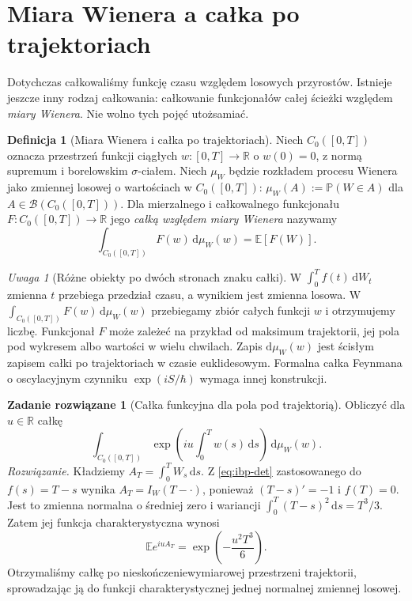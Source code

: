 \documentclass[11pt,a4paper,oneside]{report}
\numberwithin{equation}{chapter}
\theoremstyle{plain}
\theoremstyle{definition}
\newtheorem{definicja}{Definicja}[chapter]
\newtheorem{zadanie}{Zadanie rozwiązane}[chapter]
\theoremstyle{remark}
\newtheorem{uwaga}{Uwaga}[chapter]
\newcommand{\R}{\mathbb{R}}
\newcommand{\Prob}{\mathbb{P}}
\newcommand{\E}{\mathbb{E}}
\newcommand{\calB}{\mathcal{B}}
\newcommand{\dd}{\mathrm{d}}
\begin{document}
\section{Miara Wienera a całka po trajektoriach}
Dotychczas całkowaliśmy funkcję czasu względem losowych
przyrostów. Istnieje jeszcze inny rodzaj całkowania:
całkowanie funkcjonałów całej ścieżki względem \emph{miary
Wienera}. Nie wolno tych pojęć utożsamiać.

\begin{definicja}[Miara Wienera i całka po trajektoriach]
Niech $C_0([0,T])$ oznacza przestrzeń funkcji ciągłych
$w:[0,T]\to\R$ o $w(0)=0$, z normą supremum i borelowskim
$\sigma$-ciałem. Niech $\mu_W$ będzie rozkładem procesu Wienera
jako zmiennej losowej o wartościach w $C_0([0,T])$:
$\mu_W(A):=\Prob(W\in A)$ dla $A\in\calB(C_0([0,T]))$.
Dla mierzalnego i całkowalnego funkcjonału
$F:C_0([0,T])\to\R$ jego \emph{całką względem miary Wienera}
nazywamy
\[
\int_{C_0([0,T])}F(w)\,\dd\mu_W(w)=\E[F(W)].
\tag{1.7}
\]
\end{definicja}

\begin{uwaga}[Różne obiekty po dwóch stronach znaku całki]
W $\int_0^Tf(t)\,\dd W_t$ zmienna $t$ przebiega przedział
czasu, a wynikiem jest zmienna losowa. W
$\int_{C_0([0,T])}F(w)\,\dd\mu_W(w)$ przebiegamy zbiór
całych funkcji $w$ i otrzymujemy liczbę. Funkcjonał $F$
może zależeć na przykład od maksimum trajektorii,
jej pola pod wykresem albo wartości w wielu chwilach.
Zapis $\dd\mu_W(w)$ jest ścisłym zapisem całki po trajektoriach
w czasie euklidesowym. Formalna całka Feynmana o oscylacyjnym
czynniku $\exp(iS/\hbar)$ wymaga innej konstrukcji.
\end{uwaga}

\begin{zadanie}[Całka funkcyjna dla pola pod trajektorią]\label{zad:area-char}
Obliczyć dla $u\in\R$ całkę
\[
\int_{C_0([0,T])}
\exp\left(iu\int_0^T w(s)\,\dd s\right)\,\dd\mu_W(w).
\]
\emph{Rozwiązanie.}
Kładziemy $A_T=\int_0^TW_s\,\dd s$.
Z \eqref{eq:ibp-det} zastosowanego do $f(s)=T-s$
wynika $A_T=I_W(T-\cdot)$, ponieważ $(T-s)'=-1$
i $f(T)=0$. Jest to zmienna normalna o średniej zero
i wariancji
$\int_0^T(T-s)^2\,\dd s=T^3/3$.
Zatem jej funkcja charakterystyczna wynosi
\[
\E e^{iuA_T}=\exp\left(-\frac{u^2T^3}{6}\right).
\]
Otrzymaliśmy całkę po nieskończeniewymiarowej przestrzeni
trajektorii, sprowadzając ją do funkcji charakterystycznej
jednej normalnej zmiennej losowej.
\end{zadanie}
\end{document}
